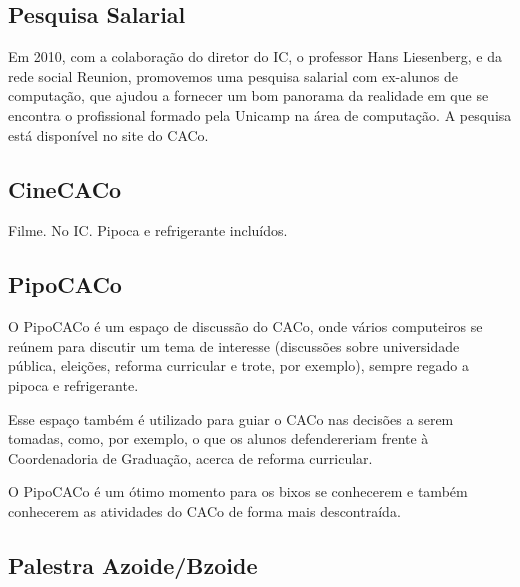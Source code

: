 \subsection{Pesquisa Salarial}

Em 2010, com a colaboração do diretor do IC, o professor Hans Liesenberg,
e da rede social Reunion, promovemos uma pesquisa salarial com
ex-alunos de computação, que ajudou a fornecer um bom panorama da realidade em que se encontra
o profissional formado pela Unicamp na área de computação. A pesquisa
está disponível no site do CACo.

\subsection{CineCACo}

Filme. No IC. Pipoca e refrigerante incluídos.

\subsection{PipoCACo}

O PipoCACo é um espaço de discussão do CACo, onde vários computeiros se reúnem
para discutir um tema de interesse (discussões sobre universidade pública,
eleições, reforma curricular e trote, por exemplo), sempre regado a pipoca
e refrigerante.

Esse espaço também é utilizado para guiar o CACo nas decisões a serem tomadas,
como, por exemplo, o que os alunos defendereriam frente à Coordenadoria de
Graduação, acerca de reforma curricular.

O PipoCACo é um ótimo momento para os bixos se conhecerem e também
conhecerem as atividades do CACo de forma mais descontraída.

\subsection{Palestra Azoide/Bzoide}

